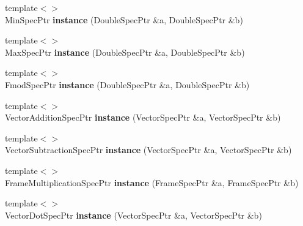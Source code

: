 \begin{DoxyCompactItemize}
\item 
\hypertarget{namespacegiskard__suturo_a8781b8a08a4b0b61b8223c925822c9dd}{{\footnotesize template$<$$>$ }\\Min\-Spec\-Ptr {\bfseries instance} (Double\-Spec\-Ptr \&a, Double\-Spec\-Ptr \&b)}\label{namespacegiskard__suturo_a8781b8a08a4b0b61b8223c925822c9dd}

\item 
\hypertarget{namespacegiskard__suturo_ae45d1de6735e11926d9e04d7e6e78d84}{{\footnotesize template$<$$>$ }\\Max\-Spec\-Ptr {\bfseries instance} (Double\-Spec\-Ptr \&a, Double\-Spec\-Ptr \&b)}\label{namespacegiskard__suturo_ae45d1de6735e11926d9e04d7e6e78d84}

\item 
\hypertarget{namespacegiskard__suturo_a118827008779fa3dfc4c79f1bd63881e}{{\footnotesize template$<$$>$ }\\Fmod\-Spec\-Ptr {\bfseries instance} (Double\-Spec\-Ptr \&a, Double\-Spec\-Ptr \&b)}\label{namespacegiskard__suturo_a118827008779fa3dfc4c79f1bd63881e}

\item 
\hypertarget{namespacegiskard__suturo_a1602610558f57ed79ad8b7d26c983f95}{{\footnotesize template$<$$>$ }\\Vector\-Addition\-Spec\-Ptr {\bfseries instance} (Vector\-Spec\-Ptr \&a, Vector\-Spec\-Ptr \&b)}\label{namespacegiskard__suturo_a1602610558f57ed79ad8b7d26c983f95}

\item 
\hypertarget{namespacegiskard__suturo_a2e87f533dfae9738b8e689bb39fdf9e3}{{\footnotesize template$<$$>$ }\\Vector\-Subtraction\-Spec\-Ptr {\bfseries instance} (Vector\-Spec\-Ptr \&a, Vector\-Spec\-Ptr \&b)}\label{namespacegiskard__suturo_a2e87f533dfae9738b8e689bb39fdf9e3}

\item 
\hypertarget{namespacegiskard__suturo_a24027242243d1e4550308229079e377e}{{\footnotesize template$<$$>$ }\\Frame\-Multiplication\-Spec\-Ptr {\bfseries instance} (Frame\-Spec\-Ptr \&a, Frame\-Spec\-Ptr \&b)}\label{namespacegiskard__suturo_a24027242243d1e4550308229079e377e}

\item 
\hypertarget{namespacegiskard__suturo_aec41e46cae13389a2d6e660b482d8175}{{\footnotesize template$<$$>$ }\\Vector\-Dot\-Spec\-Ptr {\bfseries instance} (Vector\-Spec\-Ptr \&a, Vector\-Spec\-Ptr \&b)}\label{namespacegiskard__suturo_aec41e46cae13389a2d6e660b482d8175}


\end{DoxyCompactItemize}
